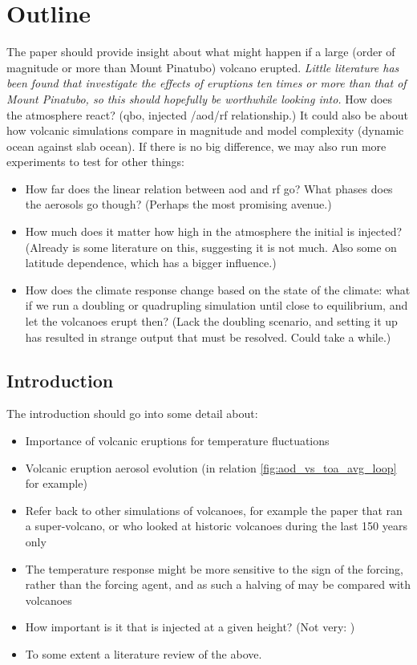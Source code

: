 \documentclass[twocol]{ametsocV5}
\newcommand{\iso}[1][i]{{#1}njected \ce{SO2}}
\begin{document}
\section{Outline}

The paper should provide insight about what might happen if a large (order of magnitude
or more than Mount Pinatubo) volcano erupted. \emph{Little literature has been found
  that investigate the effects of eruptions ten times or more than that of Mount Pinatubo,
  so this should hopefully be worthwhile looking into.} How does the atmosphere react?
(\acrshort{qbo}, \iso{}/\acrshort{aod}/\acrshort{rf} relationship.) It could also be
about how volcanic simulations compare in magnitude and model complexity (dynamic ocean
against slab ocean). If there is no big difference, we may also run more experiments to
test for other things:
\begin{itemize}
  \item How far does the linear relation between \acrshort{aod} and \acrshort{rf} go? What
        phases does the aerosols go though? (Perhaps the most promising avenue.)
  \item How much does it matter how high in the atmosphere the initial  is injected?
        (Already is some literature on this, suggesting it is not much. Also some on latitude
        dependence, which has a bigger influence.)
  \item How does the climate response change based on the state of the climate: what if we run a
         doubling or quadrupling simulation until close to equilibrium, and let the
        volcanoes erupt then? (Lack the doubling scenario, and setting it up has resulted in
        strange output that must be resolved. Could take a while.)
\end{itemize}

\subsection*{Introduction}

The introduction should go into some detail about:

\begin{itemize}
  \item Importance of volcanic eruptions for temperature fluctuations
  \item Volcanic eruption aerosol evolution (in relation \cref{fig:aod_vs_toa_avg_loop} for
        example)
  \item Refer back to other simulations of volcanoes, for example the \citet{jones2005} paper
        that ran a super-volcano, or \citet{gregory2016} who looked at historic volcanoes during
        the last 150 years only
  \item The temperature response might be more sensitive to the sign of the forcing, rather than
        the forcing agent, and as such a halving of  may be compared with volcanoes
        \citep{gunther2022}
  \item How important is it that  is injected at a given height? (Not very:
        \citet{marshall2019})
  \item To some extent a literature review of the above.
\end{itemize}
\end{document}
